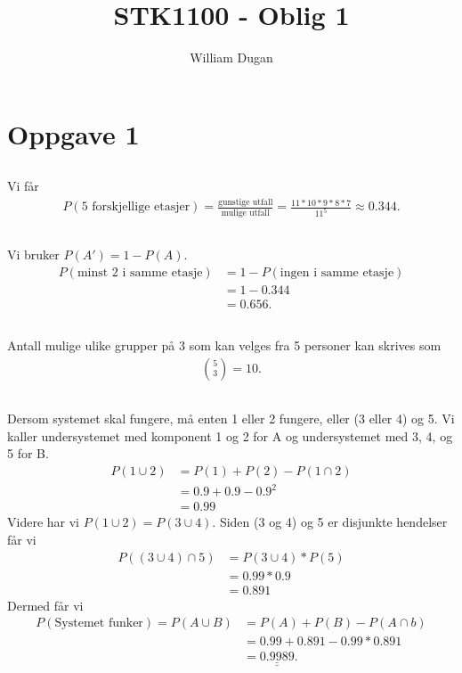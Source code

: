 \documentclass[a4paper,10pt, norsk]{article}
\title{STK1100 - Oblig 1}
\author{William Dugan}
\begin{document}
\maketitle

\section{Oppgave 1}
\subsection{}
Vi får
\begin{align*}
    P(\text{5 forskjellige etasjer}) 
    = \frac{\text{gunstige utfall}}{\text{mulige utfall}} 
    = \frac{11*10*9*8*7}{11^5} 
    \approx 0.344.
\end{align*}

\subsection{}
Vi bruker $P(A') = 1 - P(A)$.
\begin{align*}
    P(\text{minst 2 i samme etasje})
    &= 1 - P(\text{ingen i samme etasje}) \\
    &= 1 - 0.344 \\
    &= 0.656.
\end{align*}

\subsection{}
Antall mulige ulike grupper på 3 som kan velges fra 5 personer kan skrives som
\begin{align*}
    \binom{5}{3} = 10.
\end{align*}

\subsection{}
Dersom systemet skal fungere, må enten 1 eller 2 fungere, eller (3 eller 4) og 5. Vi kaller undersystemet med komponent 1 og 2 for A og undersystemet med 3, 4, og 5 for B.
\begin{align*}
    P(1 \cup 2) 
    &= P(1) + P(2) - P(1 \cap 2) \\
    &= 0.9 + 0.9 - 0.9^2 \\
    &= 0.99
\end{align*}
Videre har vi $P(1\cup2) = P(3\cup4)$. Siden (3 og 4) og 5 er disjunkte  hendelser får vi
\begin{align*}
    P((3\cup4)\cap5) 
    &= P(3\cup4) * P(5) \\
    &= 0.99 * 0.9 \\
    &= 0.891
\end{align*}
Dermed får vi
\begin{align*}
    P(\text{Systemet funker})
    = P(A \cup B) 
    &= P(A) + P(B) - P(A \cap b) \\
    &= 0.99 + 0.891 - 0.99*0.891 \\
    &= \underline{\underline{0.9989}}.
\end{align*}
\end{document}
